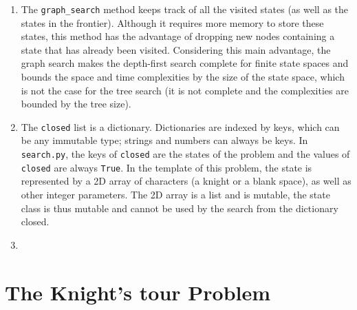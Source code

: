 \documentclass[a4paper,10pt]{article}
\newcommand{\py}[1]{\texttt{#1}}
\begin{document}
\begin{enumerate}
\begin{itemize}
 \end{itemize}
 \item The \py{graph_search} method keeps track of all the visited states (as well as the states in the frontier).
 Although it requires more memory to store these states, this method has the advantage of dropping new nodes containing a state that has already been visited.
 Considering this main advantage, the graph search makes the depth-first search complete for finite state spaces and bounds the space and time complexities by the size of the state space, which is not the case for the tree search (it is not complete and the complexities are bounded by the tree size).
 \item The \py{closed} list is a dictionary.
 Dictionaries are indexed by keys, which can be any immutable type; strings and numbers can always be keys.
 In \py{search.py}, the keys of \py{closed} are the states of the problem and the values of \py{closed} are always \py{True}.
 In the template of this problem, the state is represented by a 2D array of characters (a knight or a blank space), as well as other integer parameters.
 The 2D array is a list and is mutable, the state class is thus mutable and cannot be used by the search from the dictionary closed. 
 \item %
\end{enumerate}


\section{The Knight’s tour Problem}
\end{document}
